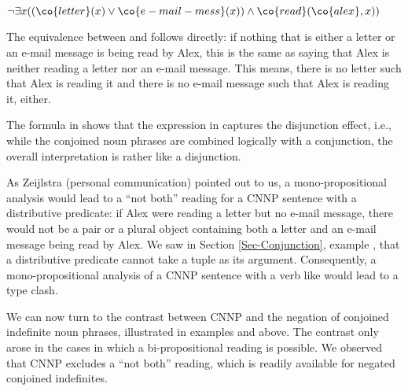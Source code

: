 \documentclass[output=paper]{langsci/langscibook}
\begin{document}
\ea \label{alex-cnnp-lf3a}
$\lnot \exists x ((\co{letter}(x) \lor \co{e-mail-mess}(x)) \land \co{read}(\co{alex},x))
$
\z 

The equivalence between  and  follows directly: if nothing that is either a letter or an e-mail message is being read by Alex, this is the same as saying that Alex is neither reading a letter nor an e-mail message. This means, there is no letter such that Alex is reading it and there is no e-mail message such that Alex is reading it, either.






The formula in  shows that the expression in  captures the disjunction effect, i.e., while the conjoined noun phrases are combined logically with a conjunction, the overall interpretation is rather like a disjunction. 

As Zeijlstra (personal communication) pointed out to us, a mono-pro\-po\-si\-tional analysis would lead to a ``not both'' reading for a CNNP sentence with a distributive predicate: if Alex were reading a letter but no e-mail message, there would not be a pair or a plural object containing both a letter and an e-mail message being read by Alex. 
We saw in Section \ref{Sec-Conjunction}, example , that a distributive predicate cannot take a tuple as its argument. 
Consequently, a mono-propositional analysis of a CNNP sentence with a verb like  would lead to a type clash.

\medskip%
We can now turn to the contrast between CNNP and the negation of conjoined indefinite noun phrases, illustrated in examples  and  above. 
The contrast only arose in the cases in which a bi-propositional reading is possible. 
We observed that CNNP excludes a ``not both'' reading, which is readily available for negated conjoined indefinites.
\end{document}
